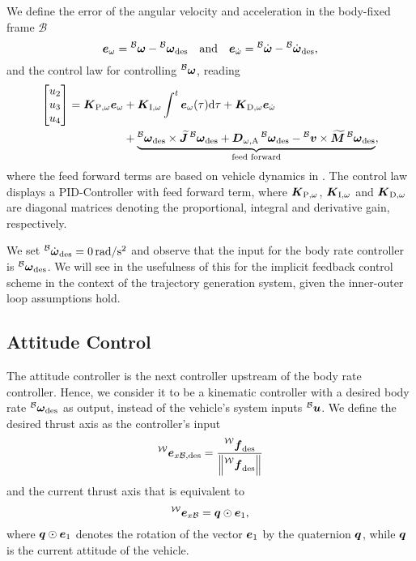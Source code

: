 We define the error of the angular velocity and acceleration in the body-fixed frame $\mathcal{B}$
\begin{equation}
	\vangerror = \vangbody - \vangdesiredbody \quad \text{and} \quad
	\aangerror = \aangbody - \aangdesiredbody
	,
\end{equation}
and the control law for controlling $\prescript{\mathcal{B}}{}{\mbox{$\bm{\omega}$}}$, reading
\begin{align}
	\begin{bmatrix}
		u_2 \\ u_3 \\ u_4
	\end{bmatrix}
	=
	\KpBodyRate \vangerror
	&+ \KiBodyRate \int_{}^{t} \vangerror(\tau)\text{d}\tau
	+ \KdBodyRate \aangerror \\\nonumber
	&+\underbrace{
		\vangdesiredbody \times \Jbs \vangdesiredbody
		+ \Domegaadded \vangdesiredbody
		- \vlinbody \times \Mbs \vangdesiredbody
	}_{\text{feed forward}}
	,
\end{align}
where the feed forward terms are based on vehicle dynamics in . The control law displays a PID-Controller with feed forward term, where $\mbox{$\bm{K}$}_{\text{P},\omega}$, $\mbox{$\bm{K}$}_{\text{I},\omega}$ and $\mbox{$\bm{K}$}_{\text{D},\omega}$ are diagonal matrices denoting the proportional, integral and derivative gain, respectively.

We set $\aangdesiredbody = \unit[0]{rad/s^2}$ and observe that the input for the body rate controller is $\vangdesiredbody$. We will see in  the usefulness of this for the implicit feedback control scheme in the context of the trajectory generation system, given the inner-outer loop assumptions hold.

\subsection{Attitude Control}
The attitude controller is the next controller upstream of the body rate controller. Hence, we consider it to be a kinematic controller with a desired body rate $\vangdesiredbody$ as output, instead of the vehicle's system inputs $\prescript{\mathcal{B}}{}{\mbox{$\bm{u}$}}$. We define the desired thrust axis as the controller's input 
\begin{equation}
	\exdesiredbodyinworld =
	\frac{\thrustdesiredworld}{
		\left\lVert\thrustdesiredworld\right\rVert
	}
\end{equation}
and the current thrust axis that is equivalent to 
\begin{equation}
	\prescript{\mathcal{W}}{}{\mbox{$\bm{e}$}}_{x\mathcal{B}} = \mbox{$\bm{q}$} \odot \mbox{$\bm{e}$}_1
	,
\end{equation}
where $\mbox{$\bm{q}$} \odot \mbox{$\bm{e}$}_1$ denotes the rotation of the vector $\mbox{$\bm{e}$}_1$ by the quaternion $\mbox{$\bm{q}$}$, while $\mbox{$\bm{q}$}$ is the current attitude of the vehicle.

